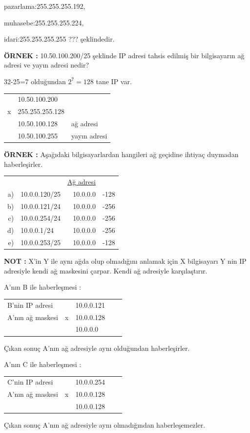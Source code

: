  pazarlama:255.255.255.192,
 
  muhasebe:255.255.255.224,
  
   idari:255.255.255.255 ??? şeklindedir. 
   
\textbf{ÖRNEK : } 10.50.100.200/25 şeklinde IP adresi tahsis edilmiş bir bilgisayarın ağ adresi ve yayın adresi nedir? 

32-25=7 olduğundan  $2^7 =128$ tane IP var. 

\begin{tabular}{lll}
 & 10.50.100.200 &\\
x&255.255.255.128& \\
\hline
 & 10.50.100.128 & ağ adresi \\
 & 10.50.100.255 & yayın adresi 
\end{tabular}    

\textbf{ÖRNEK : } Aşağıdaki bilgisayarlardan hangileri ağ geçidine ihtiyaç duymadan haberleşirler. 

\begin{center}
\begin{tabular}{rlrl}
   &               &\underline{Ağ adresi} & \\
a) & 10.0.0.120/25 & 10.0.0.0 & -128 \\
b) & 10.0.0.121/24 & 10.0.0.0 & -256 \\
c) & 10.0.0.254/24 & 10.0.0.0 & -256 \\
d) & 10.0.0.1/24 & 10.0.0.0 & -256 \\
e) & 10.0.0.253/25 & 10.0.0.0 & -128 \\

\end{tabular}

\end{center}

\textbf{NOT : } X'in Y ile aynı ağda olup olmadığını anlamak için X bilgisayarı Y nin IP adresiyle kendi ağ maskesini çarpar. Kendi ağ adresiyle karşılaştırır. 

A'nın B ile haberleşmesi : 

\begin{tabular}{lllll}
B'nin IP adresi & &10.0.0.121 &\\
A'nın ağ maskesi &x&10.0.0.128& \\
\hline 
 & & 10.0.0.0 & \\
\end{tabular} 

Çıkan sonuç A'nın ağ adresiyle aynı olduğundan haberleşirler. 

A'nın C ile haberleşmesi : 

\begin{tabular}{lllll}
C'nin IP adresi & &10.0.0.254 & \\
A'nın ağ maskesi &x&10.0.0.128& \\
\hline 
 & & 10.0.0.128 & \\
\end{tabular} 

Çıkan sonuç A'nın ağ adresiyle aynı olmadığından haberleşemezler.